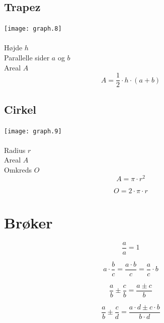 \documentclass[11pt,a5paper,fleqn,leqno]{book}
\begin{document}
\subsection{Trapez}

\texttt{[image: graph.8]}
\\
\\
Højde $h$ \\
Parallelle sider $a$ og $b$ \\
Areal $A$
\begin{equation}
A = \frac{1}{2} \cdot h \cdot (a + b)
\end{equation}

\subsection{Cirkel}

\texttt{[image: graph.9]}
\\
\\
Radius $r$ \\
Areal $A$ \\
Omkreds $O$
\begin{equation} \label{eq:areal_cirkel}
A = \pi \cdot r^2
\end{equation}

\begin{equation} \label{eq:omkreds_cirkel}
O = 2 \cdot \pi \cdot r
\end{equation}

\section{Brøker}

\begin{equation} \label{eq:taeller_naevner_det_samme}
\frac{a}{a} = 1
\end{equation}

\begin{equation} \label{eq:konstant_gange_med_broek}
a \cdot \frac{b}{c} = \frac{a \cdot b}{c} = \frac{a}{c} \cdot b
\end{equation}

\begin{equation} \label{eq:broeker_med_ens_naevnere_plusminus}
\frac{a}{b} \pm \frac{c}{b} = \frac{a \pm c}{b}
\end{equation}

\begin{equation} \label{eq:broeker_med_forskellige_naevnere_plusminus}
\frac{a}{b} \pm \frac{c}{d} = \frac{a \cdot d \pm c \cdot b}{b \cdot d}
\end{equation}
\end{document}
